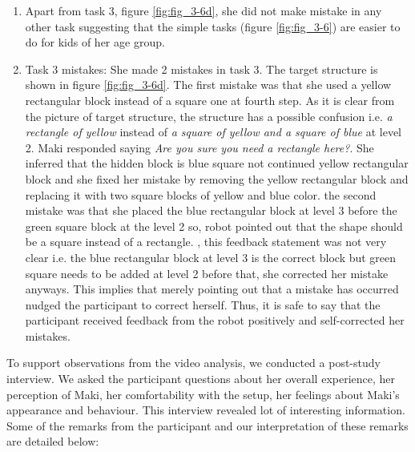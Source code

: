 \begin{enumerate}
    \item Apart from task 3, figure \ref{fig:fig_3-6d}, she did not make mistake in any other task suggesting that the simple tasks (figure \ref{fig:fig_3-6}) are easier to do for kids of her age group.
    \item Task 3 mistakes: She made 2 mistakes in task 3. The target structure is shown in figure \ref{fig:fig_3-6d}. The first mistake was that she used a yellow rectangular block instead of a square one at fourth step. As it is clear from the picture of target structure, the structure has a possible confusion i.e. \emph{a rectangle of yellow} instead of \emph{a square of yellow and a square of blue}  at level 2. Maki responded saying \emph{Are you sure you need a rectangle here?}. She inferred that the hidden block is blue square not continued yellow rectangular block and she fixed her mistake by removing the yellow rectangular block and replacing it with two square blocks of yellow and blue color. the second mistake was that she placed the blue rectangular block at level 3 before the green square block at the level 2 so, robot pointed out that the shape should be a square instead of a rectangle. , this feedback statement was not very clear i.e. the blue rectangular block at level 3 is the correct block but green square needs to be added at level 2 before that, she corrected her mistake anyways. This implies that merely pointing out that a mistake has occurred nudged the participant to correct herself. Thus, it is safe to say that the participant received feedback from the robot positively and self-corrected her mistakes.
\end{enumerate}
To support observations from the video analysis, we conducted a post-study interview. We asked the participant questions about her overall experience, her perception of Maki, her comfortability with the setup, her feelings about Maki's appearance and behaviour. This interview revealed lot of interesting information. Some of the remarks from the participant and our interpretation of these remarks are detailed below:
